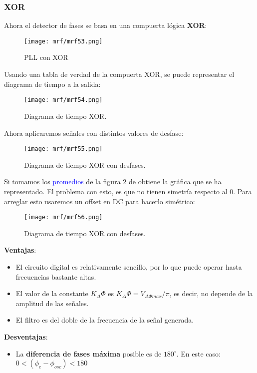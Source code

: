 \documentclass[
	12pt, %
	fleqn, %
	a4paper, %
	oneside, %
]{LegrandOrangeBook}
\begin{document}
\subsubsection{XOR}
Ahora el detector de fases se basa en una compuerta lógica \textbf{XOR}:
\begin{figure}[H]
\centering
\texttt{[image: mrf/mrf53.png]}
\caption{PLL con XOR}
\end{figure}
Usando una tabla de verdad de la compuerta XOR, se puede representar el diagrama de tiempo a la salida:
\begin{figure}[H]
\centering
\texttt{[image: mrf/mrf54.png]}
\caption{Diagrama de tiempo XOR.}
\end{figure}
Ahora aplicaremos señales con distintos valores de desfase:
\begin{figure}[H]
\centering
\texttt{[image: mrf/mrf55.png]}
\caption{Diagrama de tiempo XOR con desfases.}
\label{fig:desfasexor}
\end{figure}
Si tomamos los \textcolor{blue}{promedios} de la figura \ref{fig:desfasexor} de obtiene la gráfica que se ha representado. El problema con esto, es que no tienen simetría respecto al 0. Para arreglar esto usaremos un offset en DC para hacerlo simétrico:
\begin{figure}[H]
\centering
\texttt{[image: mrf/mrf56.png]}
\caption{Diagrama de tiempo XOR con desfases.}
\label{fig:desfasexor}
\end{figure}
\textbf{Ventajas}:
\begin{itemize}
\item El circuito digital es relativamente sencillo, por lo que puede
operar hasta frecuencias bastante altas.
\item El valor de la constante $K_\Delta\Phi$ es $K_\Delta\Phi = V_{\Delta\Phi max}/\pi$, es decir, no
depende de la amplitud de las señales.
\item El filtro es del doble de la frecuencia de la señal generada.
\end{itemize}
\textbf{Desventajas}:
\begin{itemize}
\item La \textbf{diferencia de fases máxima} posible es de $180^\circ$. En este caso: $0<(\phi_e-\phi_{osc})<180$
\end{itemize}
\end{document}
